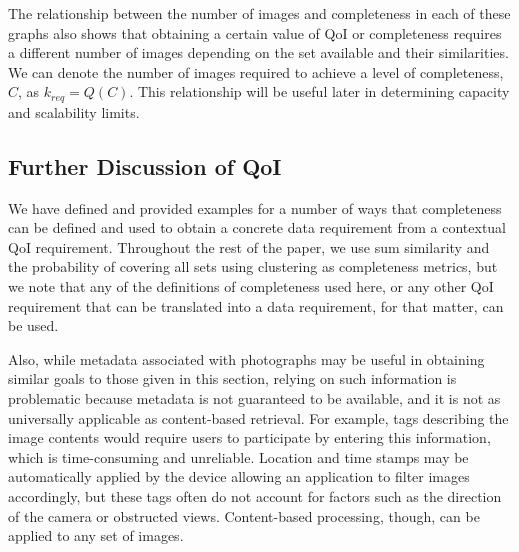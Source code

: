 The relationship between the number of images and completeness in each of these graphs also shows that obtaining a certain value of QoI or completeness requires a different number of images depending on the set available and their similarities.  We can denote the number of images required to achieve a level of completeness, $C$, as $k_{req} = Q(C)$.  This relationship will be useful later in determining capacity and scalability limits.

\subsection{Further Discussion of QoI}
We have defined and provided examples for a number of ways that completeness can be defined and used to obtain a concrete data requirement from a contextual QoI requirement.  Throughout the rest of the paper, we use sum similarity and the probability of covering all sets using clustering as completeness metrics, but we note that any of the definitions of completeness used here, or any other QoI requirement that can be translated into a data requirement, for that matter, can be used. %


Also, while metadata associated with photographs may be useful in obtaining similar goals to those given in this section, relying on such information is problematic because metadata is not guaranteed to be available, and it is not as universally applicable as content-based retrieval.  For example, tags describing the image contents would require users to participate by entering this information, which is time-consuming and unreliable.  Location and time stamps may be automatically applied by the device allowing an application to filter images accordingly, but these tags often do not account for factors such as the direction of the camera or obstructed views.  Content-based processing, though, can be applied to any set of images.



